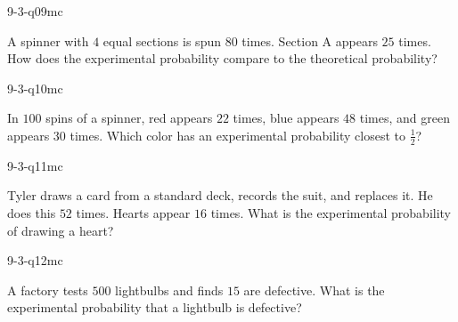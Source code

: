 \begin{practiceQuestion}{9-3-q09}{mc}
\begin{questionText}
A spinner with $4$ equal sections is spun $80$ times. Section A appears $25$ times. How does the experimental probability compare to the theoretical probability?
\end{questionText}
\end{practiceQuestion}

\begin{practiceQuestion}{9-3-q10}{mc}
\begin{questionText}
In $100$ spins of a spinner, red appears $22$ times, blue appears $48$ times, and green appears $30$ times. Which color has an experimental probability closest to $\frac{1}{2}$?
\end{questionText}
\end{practiceQuestion}

\begin{practiceQuestion}{9-3-q11}{mc}
\begin{questionText}
Tyler draws a card from a standard deck, records the suit, and replaces it. He does this $52$ times. Hearts appear $16$ times. What is the experimental probability of drawing a heart?
\end{questionText}
\end{practiceQuestion}

\begin{practiceQuestion}{9-3-q12}{mc}
\begin{questionText}
A factory tests $500$ lightbulbs and finds $15$ are defective. What is the experimental probability that a lightbulb is defective?
\end{questionText}
\end{practiceQuestion}

